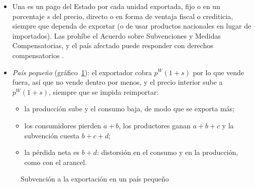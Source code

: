 \documentclass[11pt]{article}
\begin{document}
\begin{itemize}
\item Una  es un pago del Estado por cada unidad exportada, fijo o en un porcentaje $s$ del precio, directo o en forma de ventaja fiscal o crediticia, siempre que dependa de exportar (o de usar productos nacionales en lugar de importados). Las prohíbe el Acuerdo sobre Subvenciones y Medidas Compensatorias, y el país afectado puede responder con derechos compensatorios\nocite{OMC1994SMC} .
\item \emph{País pequeño} (gráfico~\ref{fig:subvencion}): el exportador cobra $p^W(1+s)$ por lo que vende fuera, así que no vende dentro por menos, y el precio interior sube a $p^W(1+s)$, siempre que se impida reimportar:
  \begin{itemize}
  \item la producción sube y el consumo baja, de modo que se exporta más;
  \item los consumidores pierden $a+b$, los productores ganan $a+b+c$ y la subvención cuesta $b+c+d$;
  \item la pérdida neta es $b+d$: distorsión en el consumo y en la producción, como con el arancel.
  \end{itemize}
\end{itemize}
\begin{figure}[H]
\centering
\caption{Subvención a la exportación en un país pequeño}\label{fig:subvencion}
\end{figure}
\end{document}
